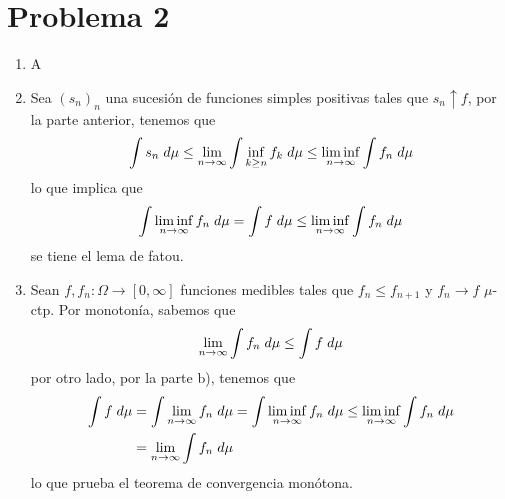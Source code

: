 \documentclass{article}
\begin{document}
\section*{Problema 2}
\begin{enumerate}
    \item A
    \item Sea $(s_{n})_{n}$ una sucesión de funciones simples positivas tales que 
    $s_{n}\uparrow f$, por la parte anterior, tenemos que
    \begin{equation*}
        \int s_{n}\hspace{1mm}d\mu\leq\lim\limits_{n\to\infty}\int \inf_{k\geq n}
        f_{k}\hspace{1mm}d\mu\leq\liminf\limits_{n\to\infty}\int f_{n}\hspace{1mm}d\mu
    \end{equation*}
    lo que implica que
    \begin{equation*}
        \int \liminf\limits_{n\to\infty}f_{n}\hspace{1mm}d\mu=\int f\hspace{1mm}d\mu\leq
        \liminf\limits_{n\to\infty}\int f_{n}\hspace{1mm}d\mu
    \end{equation*}
    se tiene el lema de fatou.

    \item Sean $f,f_{n}:\Omega\to[0,\infty]$ funciones medibles tales que $f_{n}\leq f_{n+1}$ y
    $f_{n}\to f$ $\mu$-ctp. Por monotonía, sabemos que
    \begin{equation*}
        \lim\limits_{n\to\infty}\int f_{n}\hspace{1mm}d\mu\leq\int f\hspace{1mm}d\mu
    \end{equation*}
    por otro lado, por la parte b), tenemos que
    \begin{align*}
        \int f\hspace{1mm}d\mu &= \int \lim\limits_{n\to\infty}f_{n}\hspace{1mm}d\mu
        =\int \liminf\limits_{n\to\infty}f_{n}\hspace{1mm}d\mu
        \leq\liminf\limits_{n\to\infty}\int f_{n}\hspace{1mm}d\mu \\
        &= \lim\limits_{n\to\infty}\int f_{n}\hspace{1mm}d\mu
    \end{align*}
    lo que prueba el teorema de convergencia monótona.
\end{enumerate}
\end{document}
